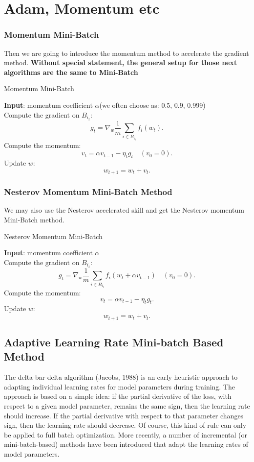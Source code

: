 \section{Adam, Momentum etc}
\subsubsection{Momentum Mini-Batch}
Then we are going to introduce the momentum method to accelerate the gradient method.  
{\bf Without special statement, the general setup for those next algorithms are the same to Mini-Batch}

\begin{algorithm}[H]
\caption{Momentum Mini-Batch}
\label{alg:mom}
{\bf Input}: momentum coefficient $\alpha$(we often choose as: 0.5, 0.9, 0.999) \\
Compute the gradient on $B_{i_t}$:
$$
g_t = \nabla_{w} \frac{1}{m} \sum_{i \in B_{i_t}} f_i(w_{t}).
$$
Compute the momentum:
\begin{equation}
v_t = \alpha v_{t-1} - \eta_t g_t \quad (v_0 = 0).
\end{equation}
Update $w$:
\begin{equation}
w_{t+1} = w_t + v_t.
\end{equation}
\end{algorithm}

\subsubsection{Nesterov Momentum Mini-Batch Method}
We may also use the Nesterov accelerated skill and get the Nesterov momentum Mini-Batch method.
\begin{algorithm}[H]
\caption{Nesterov Momentum Mini-Batch}
\label{alg:Nesterov}
{\bf Input}: momentum coefficient $\alpha$\\
Compute the gradient on $B_{i_t}$:
$$
g_t = \nabla_{w} \frac{1}{m} \sum_{i \in B_{i_t}} f_i(w_{t} + \alpha v_{t-1}) \quad (v_0 = 0).
$$
Compute the momentum:
\begin{equation}
v_t = \alpha v_{t-1} - \eta_t g_t.
\end{equation}
Update $w$:
\begin{equation}
w_{t+1} = w_t + v_t.
\end{equation}
\end{algorithm}


\subsection{Adaptive Learning Rate Mini-batch Based Method}
The delta-bar-delta algorithm (Jacobs, 1988) is an early heuristic approach to adapting individual learning rates for model parameters during training. The approach is based on a simple idea: if the partial derivative of the loss, with respect to a given model parameter, remains the same sign, then the learning rate should increase. If the partial derivative with respect to that parameter changes sign, then the learning rate should decrease. Of course, this kind of rule can only be applied to full batch optimization. More recently, a number of incremental (or mini-batch-based) methods have been introduced that adapt the learning rates of model parameters.

